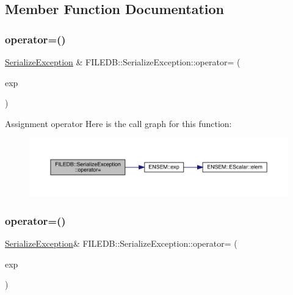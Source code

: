 \subsection{Member Function Documentation}
\mbox{\label{classFILEDB_1_1SerializeException_a0333bfcab2cc76905ff3507f84148051}} 
\subsubsection{\texorpdfstring{operator=()}{operator=()}\hspace{0.1cm}{\footnotesize\ttfamily [1/2]}}
{\footnotesize\ttfamily \mbox{\hyperlink{classFILEDB_1_1SerializeException}{Serialize\+Exception}} \& F\+I\+L\+E\+D\+B\+::\+Serialize\+Exception\+::operator= (\begin{DoxyParamCaption}\item[{const \mbox{\hyperlink{classFILEDB_1_1SerializeException}{Serialize\+Exception}} \&}]{exp }\end{DoxyParamCaption})}

Assignment operator Here is the call graph for this function\+:\nopagebreak
\begin{figure}[H]
\begin{center}
\leavevmode
\includegraphics[width=350pt]{d3/d5a/classFILEDB_1_1SerializeException_a0333bfcab2cc76905ff3507f84148051_cgraph}
\end{center}
\end{figure}
\mbox{\label{classFILEDB_1_1SerializeException_a6ec9d7b0679c5752e900d30b92015302}} 
\subsubsection{\texorpdfstring{operator=()}{operator=()}\hspace{0.1cm}{\footnotesize\ttfamily [2/2]}}
{\footnotesize\ttfamily \mbox{\hyperlink{classFILEDB_1_1SerializeException}{Serialize\+Exception}}\& F\+I\+L\+E\+D\+B\+::\+Serialize\+Exception\+::operator= (\begin{DoxyParamCaption}\item[{const \mbox{\hyperlink{classFILEDB_1_1SerializeException}{Serialize\+Exception}} \&}]{exp }\end{DoxyParamCaption})}

